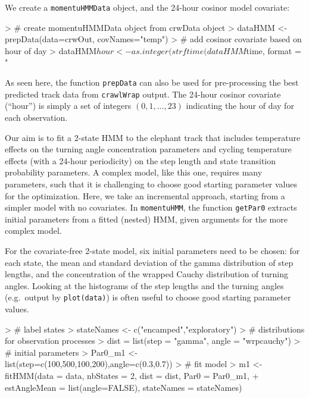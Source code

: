 \documentclass[12pt]{article}
\begin{document}
We create a \verb|momentuHMMData| object, and the 24-hour cosinor model covariate: 
\begin{Schunk}
\begin{Sinput}
> # create momentuHMMData object from crwData object
> dataHMM <- prepData(data=crwOut, covNames="temp")
> # add cosinor covariate based on hour of day
> dataHMM$hour <- as.integer(strftime(dataHMM$time, format = "%
\end{Sinput}
\end{Schunk}

As seen here, the function \verb|prepData| can also be used for pre-processing the best predicted track data from \verb|crawlWrap| output. The 24-hour cosinor covariate (``hour'') is simply a set of integers $(0,1,\ldots,23)$ indicating the hour of day for each observation. 

Our aim is to fit a 2-state HMM to the elephant track that includes temperature effects on the turning angle concentration parameters and cycling temperature effects (with a 24-hour periodicity) on the step length and state transition probability parameters. A complex model, like this one, requires many parameters, such that it is challenging to choose good starting parameter values for the optimization. Here, we take an incremental approach, starting from a simpler model with no covariates. In \verb|momentuHMM|, the function \verb|getPar0| extracts initial parameters from a fitted (nested) HMM, given arguments for the more complex model.

For the covariate-free 2-state model, six initial parameters need to be chosen: for each state, the mean and standard deviation of the gamma distribution of step lengths, and the concentration of the wrapped Cauchy distribution of turning angles. Looking at the histograms of the step lengths and the turning angles (e.g.\ output by \verb|plot(data)|) is often useful to choose good starting parameter values.

\begin{Schunk}
\begin{Sinput}
> # label states
> stateNames <- c("encamped","exploratory")
> # distributions for observation processes
> dist = list(step = "gamma", angle = "wrpcauchy")
> # initial parameters
> Par0_m1 <- list(step=c(100,500,100,200),angle=c(0.3,0.7))
> # fit model
> m1 <- fitHMM(data = data, nbStates = 2, dist = dist, Par0 = Par0_m1, 
+              estAngleMean = list(angle=FALSE), stateNames = stateNames)
\end{Sinput}
\end{Schunk}
\end{document}
